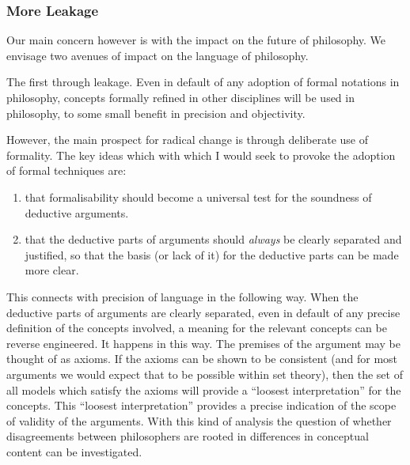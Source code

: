 \subsubsection{More Leakage}

Our main concern however is with the impact on the future of philosophy.
We envisage two avenues of impact on the language of philosophy.

The first through leakage.
Even in default of any adoption of formal notations in philosophy, concepts formally refined in other disciplines will be used in philosophy, to some small benefit in precision and objectivity.

However, the main prospect for radical change is through deliberate use of formality.
The key ideas which with which I would seek to provoke the adoption of formal techniques are:
\begin{enumerate}
\item that formalisability should become a universal test for the soundness of deductive arguments.
\item that the deductive parts of arguments should {\it always} be clearly separated and justified, so that the basis (or lack of it) for the deductive parts can be made more clear.
\end{enumerate}

This connects with precision of language in the following way.
When the deductive parts of arguments are clearly separated, even in default of any precise definition of the concepts involved, a meaning for the relevant concepts can be reverse engineered.
It happens in this way.
The premises of the argument may be thought of as axioms.
If the axioms can be shown to be consistent (and for most arguments we would expect that to be possible within set theory), then the set of all models which satisfy the axioms will provide a ``loosest interpretation'' for the concepts.
This ``loosest interpretation'' provides a precise indication of the scope of validity of the arguments.
With this kind of analysis the question of whether disagreements between philosophers are rooted in differences in conceptual content can be investigated.

